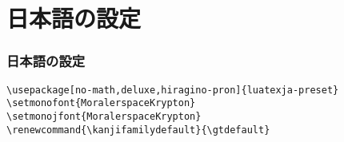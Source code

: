 \section{日本語の設定}
\begin{frame}[fragile]
    \frametitle{日本語の設定}
    \begin{verbatim}
\usepackage[no-math,deluxe,hiragino-pron]{luatexja-preset}
\setmonofont{MoralerspaceKrypton}
\setmonojfont{MoralerspaceKrypton}
\renewcommand{\kanjifamilydefault}{\gtdefault}
    \end{verbatim}
\end{frame}
